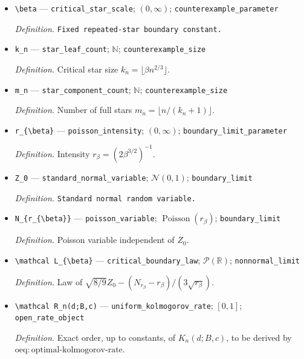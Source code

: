 \documentclass{article}
\begin{document}
\begin{itemize}
  \par\smallskip\noindent\emph{Definition.} Feasible confidence set constructed in \(\mathrm{def:wald\text{-}interval}\).
  \item \texttt{\textbackslash{}\allowbreak{}beta} --- \texttt{critical\_\allowbreak{}star\_\allowbreak{}scale}; \((0,\infty)\); \texttt{counterexample\_\allowbreak{}parameter}
  \par\smallskip\noindent\emph{Definition.} \texttt{Fixed repeated-\allowbreak{}star boundary constant.}
  \item \texttt{k\_\allowbreak{}n} --- \texttt{star\_\allowbreak{}leaf\_\allowbreak{}count}; \(\mathbb N\); \texttt{counterexample\_\allowbreak{}size}
  \par\smallskip\noindent\emph{Definition.} Critical star size \(k_n=\lfloor\beta n^{2/3}\rfloor\).
  \item \texttt{m\_\allowbreak{}n} --- \texttt{star\_\allowbreak{}component\_\allowbreak{}count}; \(\mathbb N\); \texttt{counterexample\_\allowbreak{}size}
  \par\smallskip\noindent\emph{Definition.} Number of full stars \(m_n=\lfloor n/(k_n+1)\rfloor\).
  \item \texttt{r\_\allowbreak{}\{\textbackslash{}\allowbreak{}beta\}\allowbreak{}} --- \texttt{poisson\_\allowbreak{}intensity}; \((0,\infty)\); \texttt{boundary\_\allowbreak{}limit\_\allowbreak{}parameter}
  \par\smallskip\noindent\emph{Definition.} Intensity \(r_{\beta}=(2\beta^{3/2})^{-1}\).
  \item \texttt{Z\_\allowbreak{}0} --- \texttt{standard\_\allowbreak{}normal\_\allowbreak{}variable}; \(\mathcal N(0,1)\); \texttt{boundary\_\allowbreak{}limit}
  \par\smallskip\noindent\emph{Definition.} \texttt{Standard normal random variable.}
  \item \texttt{N\_\allowbreak{}\{r\_\allowbreak{}\{\textbackslash{}\allowbreak{}beta\}\allowbreak{}\}\allowbreak{}} --- \texttt{poisson\_\allowbreak{}variable}; \(\operatorname{Poisson}(r_{\beta})\); \texttt{boundary\_\allowbreak{}limit}
  \par\smallskip\noindent\emph{Definition.} Poisson variable independent of \(Z_0\).
  \item \texttt{\textbackslash{}\allowbreak{}mathcal L\_\allowbreak{}\{\textbackslash{}\allowbreak{}beta\}\allowbreak{}} --- \texttt{critical\_\allowbreak{}boundary\_\allowbreak{}law}; \(\mathcal P(\mathbb R)\); \texttt{nonnormal\_\allowbreak{}limit}
  \par\smallskip\noindent\emph{Definition.} Law of \(\sqrt{8/9}Z_0-(N_{r_{\beta}}-r_{\beta})/(3\sqrt{r_{\beta}})\).
  \item \texttt{\textbackslash{}\allowbreak{}mathcal R\_\allowbreak{}n(d;\allowbreak{}B,\allowbreak{}c)} --- \texttt{uniform\_\allowbreak{}kolmogorov\_\allowbreak{}rate}; \([0,1]\); \texttt{open\_\allowbreak{}rate\_\allowbreak{}object}
  \par\smallskip\noindent\emph{Definition.} Exact order, up to constants, of \(K_n(d;B,c)\), to be derived by \(\mathrm{oeq:optimal\text{-}kolmogorov\text{-}rate}\).
\end{itemize}
\end{document}
